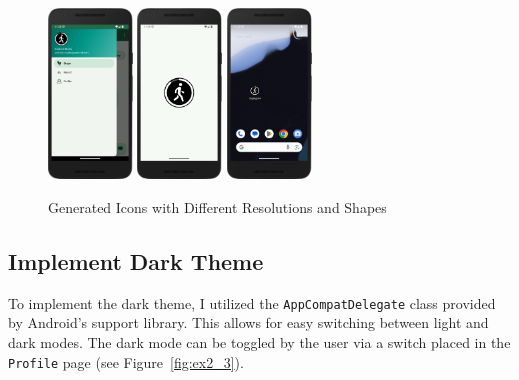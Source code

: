         \begin{figure}[H]
            \centering
            \includegraphics[width=0.20\textwidth]{res/img/icon1.png}
            \hspace{0.05\textwidth}
            \includegraphics[width=0.20\textwidth]{res/img/icon2.png}      
            \hspace{0.05\textwidth}
            \includegraphics[width=0.20\textwidth]{res/img/icon3.png}
            \caption{Generated Icons with Different Resolutions and Shapes}
            \label{fig:ex2_2.2}
        \end{figure}



\newpage


\subsection{Implement Dark Theme}
    To implement the dark theme, I utilized the \texttt{AppCompatDelegate} class provided by Android's support library. This allows for easy switching between light and dark modes. The dark mode can be toggled by the user via a switch placed in the \texttt{Profile} page (see Figure~\ref{fig:ex2_3}).

